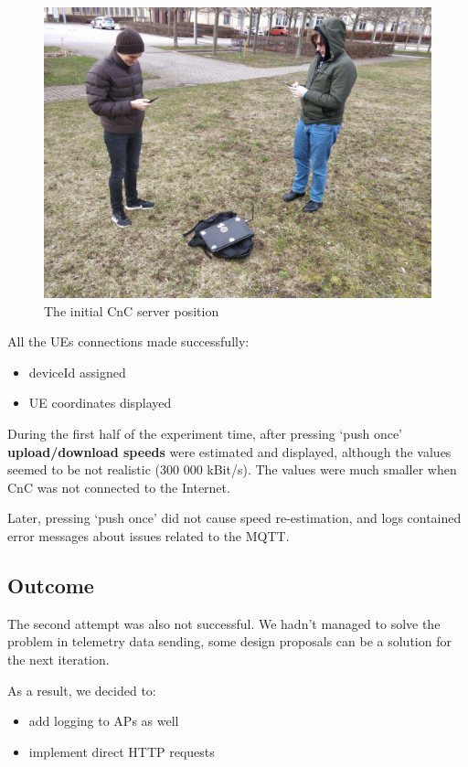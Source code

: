 \begin{figure}[H]
	\centering
	\includegraphics[width=\linewidth,keepaspectratio]{images/experiment_2_overview.jpg}
\caption{The initial CnC server position}
\end{figure}

All the UEs connections made successfully:

\begin{itemize}
\tightlist
\item
  deviceId assigned
\item
  UE coordinates displayed
\end{itemize}

During the first half of the experiment time, after pressing `push once'
\textbf{upload/download speeds} were estimated and displayed, although
the values seemed to be not realistic (300 000 kBit/s). The values were
much smaller when CnC was not connected to the Internet.

Later, pressing `push once' did not cause speed re-estimation, and logs
contained error messages about issues related to the MQTT.

\hypertarget{outcome}{%
\subsection{Outcome}\label{outcome}}

The second attempt was also not successful. We hadn't managed to solve
the problem in telemetry data sending, some design proposals can be a
solution for the next iteration.

As a result, we decided to:

\begin{itemize}
\tightlist
\item
  add logging to APs as well
\item
  implement direct HTTP requests
\end{itemize}

